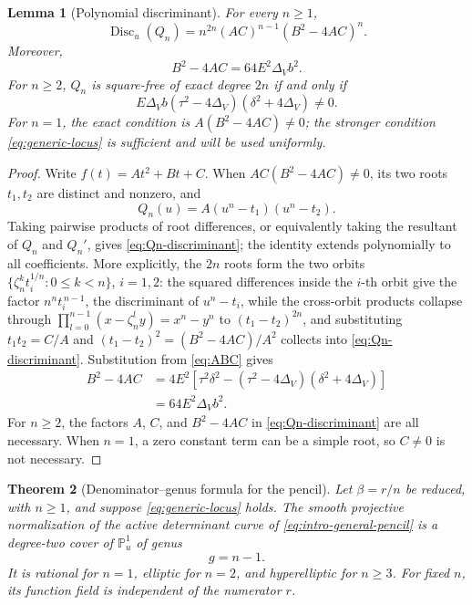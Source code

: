\documentclass[11pt,reqno]{amsart}
\newtheorem{theorem}{Theorem}[section]
\newtheorem{lemma}[theorem]{Lemma}
\theoremstyle{remark}
\newcommand{\PP}{\mathbb P}
\begin{document}
\begin{lemma}[Polynomial discriminant]\label{lem:polynomial-discriminant}
For every $n\geq1$,
\begin{equation}\label{eq:Qn-discriminant}
 \operatorname{Disc}_u(Q_n)
 =n^{2n}(AC)^{n-1}(B^2-4AC)^n.
\end{equation}
Moreover,
\begin{equation}\label{eq:branch-discriminant}
 B^2-4AC=64E^2\Delta_Vb^2.
\end{equation}
For $n\geq2$, $Q_n$ is square-free of exact degree $2n$ if and only if
\begin{equation}\label{eq:generic-locus}
 E\Delta_Vb(\tau^2-4\Delta_V)(\delta^2+4\Delta_V)\ne0.
\end{equation}
For $n=1$, the exact condition is
$A(B^2-4AC)\ne0$; the stronger condition
\eqref{eq:generic-locus} is sufficient and will be used uniformly.
\end{lemma}

\begin{proof}
Write $f(t)=At^2+Bt+C$.  When $AC(B^2-4AC)\ne0$, its two roots
$t_1,t_2$ are distinct and nonzero, and
\[
 Q_n(u)=A(u^n-t_1)(u^n-t_2).
\]
Taking pairwise products of root differences, or equivalently taking the
resultant of $Q_n$ and $Q_n'$, gives \eqref{eq:Qn-discriminant}; the identity
extends polynomially to all coefficients.  More explicitly, the $2n$ roots
form the two orbits $\{\zeta_n^k t_i^{1/n}:0\leq k<n\}$, $i=1,2$: the squared
differences inside the $i$-th orbit give the factor $n^nt_i^{\,n-1}$, the
discriminant of $u^n-t_i$, while the cross-orbit products collapse through
$\prod_{l=0}^{n-1}(x-\zeta_n^ly)=x^n-y^n$ to $(t_1-t_2)^{2n}$, and
substituting $t_1t_2=C/A$ and $(t_1-t_2)^2=(B^2-4AC)/A^2$ collects into
\eqref{eq:Qn-discriminant}.  Substitution from
\eqref{eq:ABC} gives
\begin{align*}
 B^2-4AC
 &=4E^2\left[
 \tau^2\delta^2
 -(\tau^2-4\Delta_V)(\delta^2+4\Delta_V)
 \right]\\
 &=64E^2\Delta_Vb^2.
\end{align*}
For $n\geq2$, the factors $A$, $C$, and $B^2-4AC$ in
\eqref{eq:Qn-discriminant} are all necessary.  When $n=1$, a zero constant
term can be a simple root, so $C\ne0$ is not necessary.
\end{proof}

\begin{theorem}[Denominator--genus formula for the pencil]\label{thm:denominator-genus}
Let $\beta=r/n$ be reduced, with $n\geq1$, and suppose
\eqref{eq:generic-locus} holds.  The smooth projective normalization of the
active determinant curve of \eqref{eq:intro-general-pencil} is a degree-two
cover of $\PP^1_u$ of genus
\begin{equation}\label{eq:main-genus}
 g=n-1.
\end{equation}
It is rational for $n=1$, elliptic for $n=2$, and hyperelliptic for
$n\geq3$.  For fixed $n$, its function field is independent of the numerator
$r$.
\end{theorem}
\end{document}
